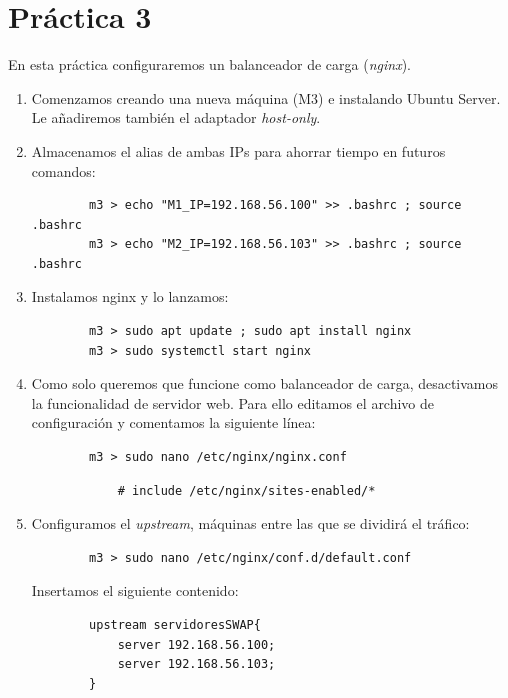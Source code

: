 \documentclass[12pt,spanish]{article}
\begin{document}
\section{Práctica 3}
En esta práctica configuraremos un balanceador de carga (\emph{nginx}).
\begin{enumerate}
	\item Comenzamos creando una nueva máquina (M3) e instalando Ubuntu Server. Le añadiremos también el adaptador \emph{host-only}.
	\item Almacenamos el alias de ambas IPs para ahorrar tiempo en futuros comandos:
		\begin{lstlisting}
		m3 > echo "M1_IP=192.168.56.100" >> .bashrc ; source .bashrc
		m3 > echo "M2_IP=192.168.56.103" >> .bashrc ; source .bashrc
		\end{lstlisting}
	\item Instalamos nginx y lo lanzamos:
		\begin{lstlisting}
		m3 > sudo apt update ; sudo apt install nginx
		m3 > sudo systemctl start nginx
		\end{lstlisting}
	\item Como solo queremos que funcione como balanceador de carga, desactivamos la funcionalidad de servidor web. Para ello editamos el archivo de configuración y comentamos la siguiente línea:
		\begin{lstlisting}
		m3 > sudo nano /etc/nginx/nginx.conf
		\end{lstlisting}
			\begin{lstlisting}
			# include /etc/nginx/sites-enabled/*
			\end{lstlisting}
		\item Configuramos el \emph{upstream}, máquinas entre las que se dividirá el tráfico:
		\begin{lstlisting}
		m3 > sudo nano /etc/nginx/conf.d/default.conf
		\end{lstlisting}
		Insertamos el siguiente contenido:
		\begin{lstlisting}
		upstream servidoresSWAP{
			server 192.168.56.100;
			server 192.168.56.103;
		}


\end{lstlisting}
\end{enumerate}
\end{document}
